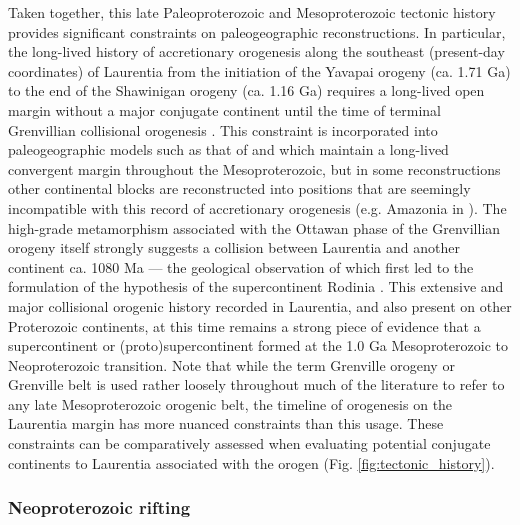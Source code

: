 \documentclass[twocolumn, switch]{article} %
\begin{document}
Taken together, this late Paleoproterozoic and Mesoproterozoic tectonic history provides significant constraints on paleogeographic reconstructions. In particular, the long-lived history of accretionary orogenesis along the southeast (present-day coordinates) of Laurentia from the initiation of the Yavapai orogeny (ca. 1.71 Ga) to the end of the Shawinigan orogeny (ca. 1.16 Ga) requires a long-lived open margin without a major conjugate continent until the time of terminal Grenvillian collisional orogenesis \citep{Karlstrom2001a}. This constraint is incorporated into paleogeographic models such as that of \citet{Zhang2012a} and \citet{Pehrsson2015a} which maintain a long-lived convergent margin throughout the Mesoproterozoic, but in some reconstructions other continental blocks are reconstructed into positions that are seemingly incompatible with this record of accretionary orogenesis (e.g. Amazonia in \citealp{Elming2009a, Elming2021a}). The high-grade metamorphism associated with the Ottawan phase of the Grenvillian orogeny itself strongly suggests a collision between Laurentia and another continent ca. 1080 Ma --- the geological observation of which first led to the formulation of the hypothesis of the supercontinent Rodinia \citep{Hoffman1991a}. This extensive and major collisional orogenic history recorded in Laurentia, and also present on other Proterozoic continents, at this time remains a strong piece of evidence that a supercontinent or (proto)supercontinent formed at the 1.0 Ga Mesoproterozoic to Neoproterozoic transition. Note that while the term Grenville orogeny or Grenville belt is used rather loosely throughout much of the literature to refer to any late Mesoproterozoic orogenic belt, the timeline of orogenesis on the Laurentia margin has more nuanced constraints than this usage. These constraints can be comparatively assessed when evaluating potential conjugate continents to Laurentia associated with the orogen (Fig. \ref{fig:tectonic_history}).

\subsubsection{Neoproterozoic rifting}
\end{document}
